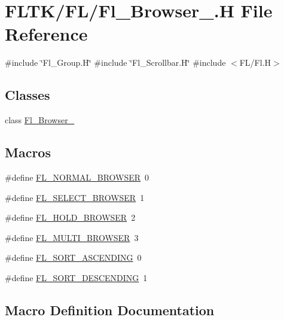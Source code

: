\hypertarget{_fl___browser___8_h}{}\section{F\+L\+T\+K/\+F\+L/\+Fl\+\_\+\+Browser\+\_\+.H File Reference}
\label{_fl___browser___8_h}
{\ttfamily \#include \char`\"{}Fl\+\_\+\+Group.\+H\char`\"{}}\newline
{\ttfamily \#include \char`\"{}Fl\+\_\+\+Scrollbar.\+H\char`\"{}}\newline
{\ttfamily \#include $<$F\+L/\+Fl.\+H$>$}\newline
\subsection*{Classes}
\begin{DoxyCompactItemize}
\item 
class \hyperlink{class_fl___browser__}{Fl\+\_\+\+Browser\+\_\+}
\end{DoxyCompactItemize}
\subsection*{Macros}
\begin{DoxyCompactItemize}
\item 
\#define \hyperlink{_fl___browser___8_h_ab98fe4418e017f64e92be3876efa9eea}{F\+L\+\_\+\+N\+O\+R\+M\+A\+L\+\_\+\+B\+R\+O\+W\+S\+ER}~0
\item 
\#define \hyperlink{_fl___browser___8_h_adbea05fecd2f20829d59f23da36e49cf}{F\+L\+\_\+\+S\+E\+L\+E\+C\+T\+\_\+\+B\+R\+O\+W\+S\+ER}~1
\item 
\#define \hyperlink{_fl___browser___8_h_ab308b9268a80cec0767533fe44e95153}{F\+L\+\_\+\+H\+O\+L\+D\+\_\+\+B\+R\+O\+W\+S\+ER}~2
\item 
\#define \hyperlink{_fl___browser___8_h_a40388244ce895f6795892d444221b4a0}{F\+L\+\_\+\+M\+U\+L\+T\+I\+\_\+\+B\+R\+O\+W\+S\+ER}~3
\item 
\#define \hyperlink{_fl___browser___8_h_a230f5df7bb573939b3c4ce5f38faedf6}{F\+L\+\_\+\+S\+O\+R\+T\+\_\+\+A\+S\+C\+E\+N\+D\+I\+NG}~0
\item 
\#define \hyperlink{_fl___browser___8_h_a0ca602f4bc7f8e3aa9fabe833e28176d}{F\+L\+\_\+\+S\+O\+R\+T\+\_\+\+D\+E\+S\+C\+E\+N\+D\+I\+NG}~1
\end{DoxyCompactItemize}


\subsection{Macro Definition Documentation}
\mbox{\label{_fl___browser___8_h_ab308b9268a80cec0767533fe44e95153}} 
